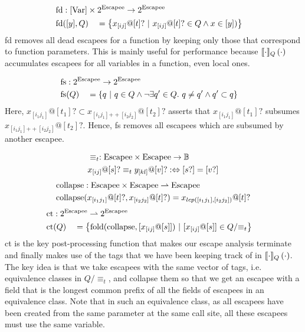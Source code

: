 \newcommand{\collapse}{\mathrm{collapse}}

\begin{alignat*}{3}
	\fd &: \mathrlap{[\Var] \times 2^{\Escapee} \to 2^{\Escapee}} \\
	\fd&([y], Q) &&= \left\{x_{[ij]}@[t]? \ |\ x_{[ij]}@[t]? \in Q \land x \in [y]) \right\}
\end{alignat*}
fd removes all dead escapees for a function by keeping only those that correspond to function parameters. This is mainly useful for performance because $\llbracket {\cdot} \rrbracket_Q \left( {\cdot} \right)$ accumulates escapees for all variables in a function, even local ones.

\newcommand{\concat}{\mathrm{++}}

\begin{alignat*}{3}
	\fs &: \mathrlap{2^{\Escapee} \to 2^{\Escapee}} \\
	\fs&(Q) &&= \left\{q \ |\ q \in Q \land \lnot \exists q' \in Q.\ q \neq q' \land q' \subset q\right\}
\end{alignat*}
Here, $x_{[i_1j_1]} @ [t_1]? \subset x_{[i_1j_1]\concat[i_2j_2]} @ [t_2]?$ asserts that $x_{[i_1j_1]} @ [t_1]?$ subsumes $x_{[i_1j_1]\concat[i_2j_2]} @ [t_2]?$. Hence, fs removes all escapees which are subsumed by another escapee.

\begin{alignat*}{1}
	&\equiv_t : \mathrm{Escapee} \times \mathrm{Escapee} \to \mathbb{B} \\
	&x_{[ij]} @ [s]? \equiv_t y_{[kl]} @ [v]? :\Leftrightarrow [s?] = [v?]
\end{alignat*}
\begin{align*}
	\collapse &: \Escapee \times \Escapee \rightharpoonup \Escapee \\
	\collapse&(x_{[i_1j_1]} @ [t]?, x_{[i_2j_2]} @ [t]?) = x_{lcp([i_1j_1], [i_2j_2])} @ [t]?
\end{align*}
\begin{alignat*}{3}
	\ct &: \mathrlap{2^{\Escapee} \rightharpoonup 2^{\Escapee}} \\
	\ct&(Q) &&= \left\{\mathrm{fold}(\collapse, [x_{[ij]} @ [s]])\ |\ [x_{[ij]} @ [s]] \in Q/{\equiv_t} \right\}
\end{alignat*}
ct is the key post-processing function that makes our escape analysis terminate and finally makes use of the tags that we have been keeping track of in $\llbracket {\cdot} \rrbracket_Q \left( {\cdot} \right)$. The key idea is that we take escapees with the same vector of tags, i.e. equivalence classes in $Q/{\equiv_t}$, and collapse them so that we get an escapee with a field that is the longest common prefix of all the fields of escapees in an equivalence class. Note that in such an equivalence class, as all escapees have been created from the same parameter at the same call site, all these escapees must use the same variable.

